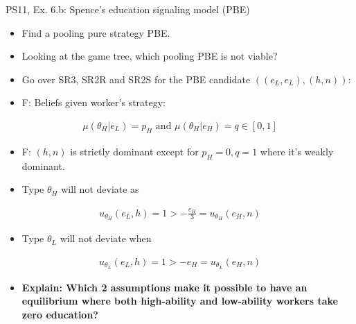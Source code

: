 \begin{frame}{PS11, Ex. 6.b: Spence’s education signaling model (PBE)}
    \begin{multicols}{2}
      \begin{itemize}
        \item[(b)] Find a pooling pure strategy PBE.
        \item[Step 1:] Looking at the game tree, which pooling PBE is not viable?
        \item[Step 2:] Go over SR3, SR2R and SR2S for the PBE candidate $((e_L,e_L),(h,n))$:
        \item[SR3:] F: Beliefs given worker's strategy:
      \end{itemize}\vspace{-10pt}
      \begin{align*}
        \mu(\theta_H|e_L)=p_H\text{ and }\mu(\theta_H|e_H)=q\in[0,1]
      \end{align*}\vspace{-20pt}
      \begin{itemize}
        \item[SR2R:] F: $(h,n)$ is strictly dominant except for $p_H=0,q=1$ where it's weakly dominant.
        \item[SR2S:] Type $\theta_H$ will not deviate as
      \end{itemize}\vspace{-12pt}
      \begin{align*}
        u_{\theta_H}(e_L,h)=1>-\frac{e_H}{3}=u_{\theta_H}(e_H,n)
      \end{align*}\vspace{-20pt}
      \begin{itemize}
        \item[] Type $\theta_L$ will not deviate when
      \end{itemize}\vspace{-12pt}
      \begin{align*}
        u_{\theta_L}(e_L,h)=1>-e_H=u_{\theta_L}(e_H,n)
      \end{align*}\vspace{-20pt}
      \begin{itemize}
        \item[Step 3:] \textbf{Explain: Which 2 assumptions make it possible to have an equilibrium where both high-ability and low-ability workers take zero education?}
      \end{itemize}
      \vfill\null\columnbreak
      \begin{figure}[!h]

\end{figure}
\end{multicols}
\end{frame}
